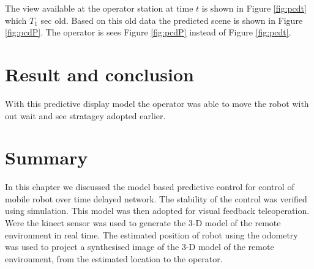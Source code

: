 The view available at the operator station at time $t$ is shown in Figure \ref{fig:pcdt} which $T_1$ sec old. Based on this old data the predicted scene is shown in Figure \ref{fig:pcdP}.  The operator is sees  Figure \ref{fig:pcdP} instead of Figure \ref{fig:pcdt}.

\section{Result and conclusion}
With this predictive display model the operator was able to move the robot with out wait and see stratagey adopted earlier. 

\section{Summary}
In this chapter we discussed the model based predictive control for control of mobile robot over time delayed network. The stability of the control was verified using simulation. This model was then adopted for visual feedback teleoperation. Were the kinect sensor was used to generate the 3-D model of the remote environment in real time. The estimated position of robot using the odometry was used to project a synthesised image of the 3-D model of the remote environment, from the estimated location to the operator. 
